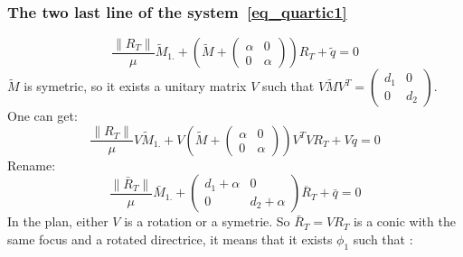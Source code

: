 \subsubsection{The two last line of the system~\ref{eq_quartic1}}
\begin{equation}
\label{eq_quartic5}
\frac{\parallel R_T \parallel}{\mu} \tilde M_{1.} +\left(\tilde M+\left(\begin{array}{cc} \alpha&0 \\ 0&\alpha \end{array}\right)\right)R_T+\tilde q=0
\end{equation}
$\tilde M$ is symetric, so it exists a unitary matrix $V$ such that $V \tilde M V^T = \left(\begin{array}{cc} d_1&0 \\ 0&d_2 \end{array}\right)$.  One can get:
\begin{equation}
\label{eq_quartic6}
\frac{\parallel R_T \parallel}{\mu} V \tilde M_{1.} +V \left(\tilde M+\left(\begin{array}{cc} \alpha&0 \\ 0&\alpha \end{array}\right)\right)V^TVR_T+V\tilde q=0
\end{equation}
Rename:
\begin{equation}
\label{eq_quartic7}
  \frac{\parallel \bar R_T \parallel}{\mu} \bar M_{1.} +\left(\begin{array}{cc} d_1+\alpha&0 \\ 0&d_2+\alpha \end{array}\right)\overline R_T+\bar q=0
  \end{equation}
In the plan, either $V$ is a rotation or a symetrie. So $ \bar R_T=VR_T$ is a conic with the same focus and a rotated directrice, it means that it exists $\phi_1$ such that :

